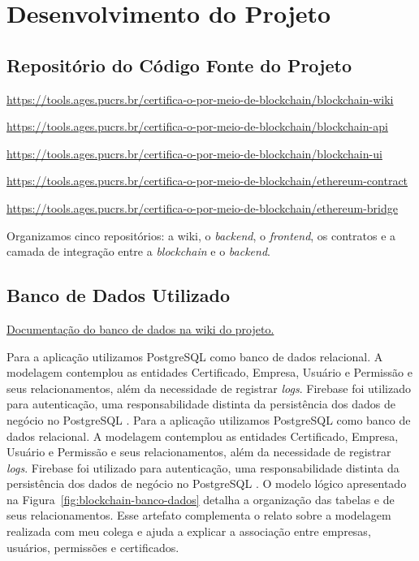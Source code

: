 \section[Desenvolvimento do Projeto]{Desenvolvimento do Projeto}

\subsection{Repositório do Código Fonte do Projeto}
  \url{https://tools.ages.pucrs.br/certifica-o-por-meio-de-blockchain/blockchain-wiki}

  \url{https://tools.ages.pucrs.br/certifica-o-por-meio-de-blockchain/blockchain-api}

  \url{https://tools.ages.pucrs.br/certifica-o-por-meio-de-blockchain/blockchain-ui}

  \url{https://tools.ages.pucrs.br/certifica-o-por-meio-de-blockchain/ethereum-contract}

  \url{https://tools.ages.pucrs.br/certifica-o-por-meio-de-blockchain/ethereum-bridge}

  Organizamos cinco repositórios: a wiki, o \textit{backend}, o \textit{frontend}, os contratos e a camada de integração entre a \textit{blockchain} e o \textit{backend}.

\subsection{Banco de Dados Utilizado}
 \href{https://tools.ages.pucrs.br/certifica-o-por-meio-de-blockchain/blockchain-wiki/-/wikis/Banco-de-Dados}{Documentação do banco de dados na wiki do projeto.}

Para a aplicação utilizamos PostgreSQL como banco de dados relacional. A modelagem contemplou as entidades Certificado, Empresa, Usuário e Permissão e seus relacionamentos, além da necessidade de registrar \textit{logs}. Firebase foi utilizado para autenticação, uma responsabilidade distinta da persistência dos dados de negócio no PostgreSQL \cite{postgres,firebase,blockchain}.
\sloppy
Para a aplicação utilizamos PostgreSQL como banco de dados relacional. A modelagem contemplou as entidades Certificado, Empresa, Usuário e Permissão e seus relacionamentos, além da necessidade de registrar \textit{logs}. Firebase foi utilizado para autenticação, uma responsabilidade distinta da persistência dos dados de negócio no PostgreSQL \cite{postgres,firebase,blockchain}.
\sloppy
O modelo lógico apresentado na Figura~\ref{fig:blockchain-banco-dados} detalha a organização das tabelas e de seus relacionamentos. Esse artefato complementa o relato sobre a modelagem realizada com meu colega e ajuda a explicar a associação entre empresas, usuários, permissões e certificados.

